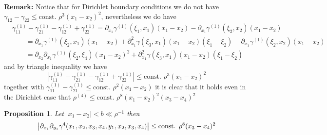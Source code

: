 \documentclass[a4paper,11pt]{article}
\newcommand{\abs}[1]{\left\lvert #1 \right\rvert}
\newtheorem{proposition}{Proposition}
\numberwithin{equation}{section}
\begin{document}
		\textbf{Remark: }Notice that for Dirichlet boundary conditions we do not have $ \gamma_{12}-\gamma_{22}\leq \text{const. }\rho^3(x_1-x_2)^2 $, nevertheless we do have \begin{equation}
		\begin{aligned}
			&\gamma^{(1)}_{11}-\gamma^{(1)}_{21}-\gamma^{(1)}_{12}+\gamma^{(1)}_{22}=\partial_{x_1}\gamma^{(1)}(\xi_1,x_1)(x_1-x_2)-\partial_{x_1}\gamma^{(1)}(\xi_2,x_2)(x_1-x_2)\\
			&\qquad=\partial_{x_1}\gamma^{(1)}(\xi_2,x_1)(x_1-x_2)+\partial_{x_1}^2\gamma(\xi_3,x_1)(x_1-x_2)(\xi_1-\xi_2)-\partial_{x_1}\gamma^{(1)}(\xi_2,x_2)(x_1-x_2)\\
			&\qquad=\partial_{x_2}\partial_{x_1}\gamma^{(1)}(\xi_2,\xi_4)(x_1-x_2)^2+\partial_{x_1}^2\gamma(\xi_3,x_1)(x_1-x_2)(\xi_1-\xi_2)
		\end{aligned}
		\end{equation}
		and by triangle inequality we have \begin{equation}
		\abs{\gamma^{(1)}_{11}-\gamma^{(1)}_{21}-\gamma^{(1)}_{12}+\gamma^{(1)}_{22}}\leq \text{const. }\rho^3(x_1-x_2)^2
		\end{equation}
		together with $ \gamma^{(1)}_{11}-\gamma^{(1)}_{21}\leq \text{const. } \rho^2 (x_1-x_2)$ it is clear that it holds even in the Dirichlet case that $ \rho^{(4)}\leq \text{const. }\rho^8(x_1-x_2)^2(x_3-x_4)^2 $
		\begin{proposition}
			Let $ \abs{x_1-x_2}<b\ll\rho^{-1} $ then \begin{equation}
			\abs{\partial_{x_1}\partial_{y_1}\gamma^{4}(x_1,x_2,x_3,x_4,y_1,x_2,x_3,x_4)}\leq \textnormal{const. }\rho^8(x_3-x_4)^2
			\end{equation}
		\end{proposition}
\end{document}
